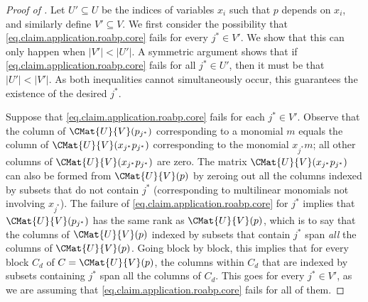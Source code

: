\documentclass{toc}
\begin{document}
  \begin{proof}[Proof of ]
  Let \(U'\subseteq U\) be the indices of variables \(x_i\) such that \(p\)
  depends on \(x_i\),
  and similarly define \(V'\subseteq V\).
  We first consider the possibility that
  \eqref{eq.claim.application.roabp.core} fails for every
  \(j^* \in V'\).
  We show that this can only happen when \(|V'| < |U'|\).
  A symmetric argument shows that if \eqref{eq.claim.application.roabp.core}
  fails for all \(j^* \in U'\),
  then it must be that \(|U'| < |V'|\).
  As both inequalities cannot simultaneously occur,
  this guarantees the existence of the desired \(j^*\).

  Suppose that \eqref{eq.claim.application.roabp.core} fails
  for each \(j^* \in V'\).
  Observe that the column of \(\CMat{U}{V}(p_{j^*})\) corresponding to a
  monomial $m$ equals the column of \(\CMat{U}{V}(x_{j^*} p_{j^*})\)
  corresponding to the monomial $x_{j^*} m$;
  all other columns of \(\CMat{U}{V}(x_{j^*} p_{j^*})\) are zero.
  The matrix \(\CMat{U}{V}(x_{j^*} p_{j^*})\) can also be formed from
  \(\CMat{U}{V}(p)\) by zeroing out all the columns indexed by subsets that do
  not contain $j^*$
  (corresponding to multilinear monomials not involving \(x_{j^*}\)).
  The failure of \eqref{eq.claim.application.roabp.core} for \(j^*\) implies
  that \(\CMat{U}{V}(p_{j^*})\) has the same rank as \(\CMat{U}{V}(p)\),
  which is to say that the columns of \(\CMat{U}{V}(p)\) indexed by subsets
  that contain $j^*$ span \emph{all} the columns of \(\CMat{U}{V}(p)\).
  Going block by block,
  this implies that for every block \(C_d\) of \(C = \CMat{U}{V}(p)\),
  the columns within \(C_d\) that are indexed by subsets containing $j^*$ span
  all the columns of \(C_d\).
  This goes for every \(j^* \in V'\),
  as we are assuming that \eqref{eq.claim.application.roabp.core} fails for
  all of them.


\end{proof}
\end{document}
